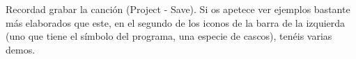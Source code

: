 \documentclass[es,practica]{uah}
\begin{document}
Recordad grabar la canción (Project - Save). Si os apetece ver ejemplos bastante más elaborados que este, en el segundo de los iconos de la barra de la izquierda (uno que tiene el símbolo del programa, una especie de cascos), tenéis varias demos. 


%
%
%
%
%
%
%
%
%
%
%
%
%
\end{document}
